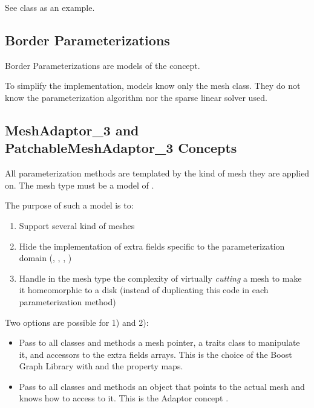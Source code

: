 See  
class as an example.


\subsection{Border Parameterizations}

Border Parameterizations are models of the  concept.

To simplify the implementation,  models know only the
 mesh class. They do not know the parameterization algorithm
nor the sparse linear solver used.


\subsection{MeshAdaptor\_3 and PatchableMeshAdaptor\_3 Concepts}

All parameterization methods are templated by the kind of mesh they are applied on.
The mesh type must be a model of .

The purpose of such a model is to:
\begin{enumerate}
\item Support several kind of meshes
\item Hide the implementation of extra fields specific to the parameterization domain
      (, , , )
\item Handle in the mesh type the complexity of virtually {\em cutting} a mesh
      to make it homeomorphic to a disk (instead of duplicating this
      code in each parameterization method)
\end{enumerate}

Two options are possible for 1) and 2):
\begin{itemize}
\item Pass to all classes and methods a mesh pointer, a traits class to manipulate it,
      and accessors to the extra fields arrays.
      This is the choice of the Boost Graph Library with 
      and the property maps.
\item Pass to all classes and methods an object that points to the actual mesh and knows
      how to access to it. This is the Adaptor concept \cite{cgal:ghjv-dpero-95}.
\end{itemize}

